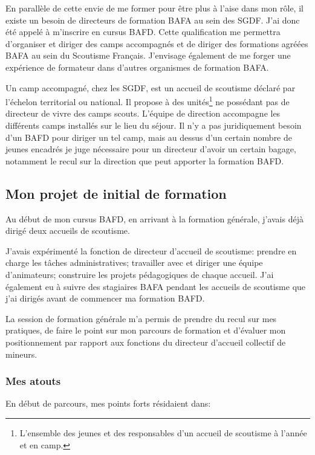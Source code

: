 \documentclass[titlepage,11pt,a4paper]{article}
\begin{document}
En parallèle de cette envie de me former pour être plus à l'aise dans mon rôle,
il existe un besoin de directeurs de formation BAFA au sein des SGDF\@. J'ai donc été appelé
à m'inscrire en cursus BAFD\@. Cette qualification me permettra d'organiser et diriger des
camps accompagnés et de diriger des formations agréées BAFA au sein du Scoutisme Français.
J'envisage également de me forger une expérience de formateur dans d'autres organismes de
formation BAFA\@.

Un camp accompagné, chez les SGDF, est un accueil de scoutisme déclaré par l'échelon
territorial ou national. Il propose à des unités\footnote{L'ensemble des jeunes et des
responsables d'un accueil de scoutisme à l'année et en camp.} ne possédant pas
de directeur de vivre des camps scouts. L'équipe de direction accompagne les différents
camps installés sur le lieu du séjour. Il n'y a pas juridiquement besoin d'un BAFD pour
diriger un tel camp, mais au dessus d'un certain nombre de jeunes encadrés je juge
nécessaire pour un directeur d'avoir un certain bagage, notamment le recul sur la
direction que peut apporter la formation BAFD\@.

\subsection{Mon projet de initial de formation}

Au début de mon cursus BAFD, en arrivant à la formation générale, j'avais déjà dirigé deux
accueils de scoutisme.

J'avais expérimenté la fonction de directeur d'accueil de scoutisme:
prendre en charge les tâches administratives; travailler avec et diriger une équipe d'animateurs;
construire les projets pédagogiques de chaque accueil. J'ai également eu à suivre des
stagiaires BAFA pendant les accueils de scoutisme que j'ai dirigés avant de commencer ma
formation BAFD\@.

La session de formation générale m'a permis de prendre du recul sur mes pratiques, de
faire le point sur mon parcours de formation et d'évaluer mon positionnement par rapport
aux fonctions du directeur d'accueil collectif de mineurs.

\subsubsection{Mes atouts}

En début de parcours, mes points forts résidaient dans:
\end{document}
